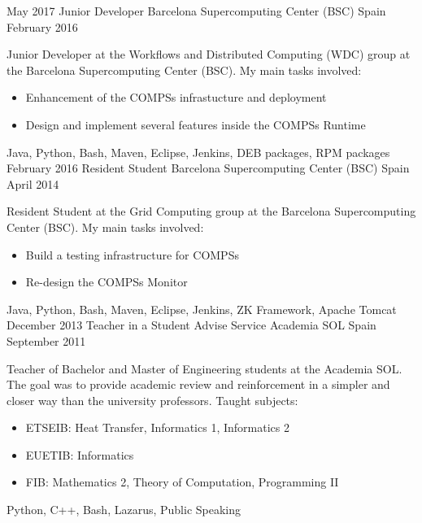 \begin{experiences}
    \emptySeparator
    \experience
        {May 2017}
        {Junior Developer}
        {Barcelona Supercomputing Center (BSC)}
        {Spain}
        {February 2016}
        {Junior Developer at the Workflows and Distributed Computing (WDC) group at the Barcelona Supercomputing Center (BSC). My main tasks involved:
        \begin{itemize}
            \item Enhancement of the COMPSs infrastucture and deployment
            \item Design and implement several features inside the COMPSs Runtime
        \end{itemize}
        }
        {Java, Python, Bash, Maven, Eclipse, Jenkins, DEB packages, RPM packages}
    \emptySeparator
    \experience
        {February 2016}
        {Resident Student}
        {Barcelona Supercomputing Center (BSC)}
        {Spain}
        {April 2014}
        {Resident Student at the Grid Computing group at the Barcelona Supercomputing Center (BSC). My main tasks involved:
        \begin{itemize}
            \item Build a testing infrastructure for COMPSs
            \item Re-design the COMPSs Monitor
        \end{itemize}
        }
        {Java, Python, Bash, Maven, Eclipse, Jenkins, ZK Framework, Apache Tomcat}
    \emptySeparator
    \experience
        {December 2013}
        {Teacher in a Student Advise Service}
        {Academia SOL}
        {Spain}
        {September 2011}
        {Teacher of Bachelor and Master of Engineering students at the Academia SOL. The goal was to provide academic review and reinforcement in a simpler and closer way than the university professors. Taught subjects:
        \begin{itemize}
            \item ETSEIB: Heat Transfer, Informatics 1, Informatics 2
            \item EUETIB: Informatics
            \item FIB: Mathematics 2, Theory of Computation, Programming II
        \end{itemize}
        }
        {Python, C++, Bash, Lazarus, Public Speaking}

\end{experiences}
